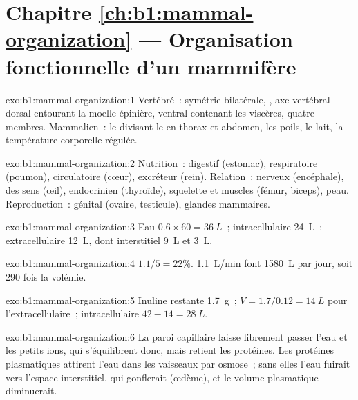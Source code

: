 \section*{Chapitre \ref{ch:b1:mammal-organization} --- Organisation fonctionnelle d'un mammifère}

\begin{solution}{exo:b1:mammal-organization:1}
Vertébré~: symétrie bilatérale, , axe vertébral dorsal
entourant la moelle épinière,  ventral contenant les viscères,
quatre membres. Mammalien~: le  divisant le  en thorax
et abdomen, les poils, le lait, la température corporelle régulée.
\end{solution}

\begin{solution}{exo:b1:mammal-organization:2}
Nutrition~: digestif (estomac), respiratoire (poumon), circulatoire
(cœur), excréteur (rein). Relation~: nerveux (encéphale),  des
sens (œil), endocrinien (thyroïde), squelette et muscles (fémur,
biceps), peau. Reproduction~: génital (ovaire, testicule), glandes
mammaires.
\end{solution}

\begin{solution}{exo:b1:mammal-organization:3}
Eau $0.6\times 60 = \qty{36}{L}$~; intracellulaire \qty{24}{L}~;
extracellulaire \qty{12}{L}, dont interstitiel \qty{9}{L} et 
\qty{3}{L}.
\end{solution}

\begin{solution}{exo:b1:mammal-organization:4}
$1.1/5 = 22\%$. \qty{1.1}{L/min} font \qty{1580}{L} par jour, soit 290
fois la volémie.
\end{solution}

\begin{solution}{exo:b1:mammal-organization:5}
Inuline restante \qty{1.7}{g}~; $V = 1.7/0.12 = \qty{14}{L}$ pour
l'extracellulaire~; intracellulaire $42 - 14 = \qty{28}{L}$.
\end{solution}

\begin{solution}{exo:b1:mammal-organization:6}
La paroi capillaire laisse librement passer l'eau et les petits ions,
qui s'équilibrent donc, mais retient les protéines. Les protéines
plasmatiques attirent l'eau dans les vaisseaux par osmose~; sans elles
l'eau fuirait vers l'espace interstitiel, qui gonflerait (œdème), et le
volume plasmatique diminuerait.
\end{solution}

